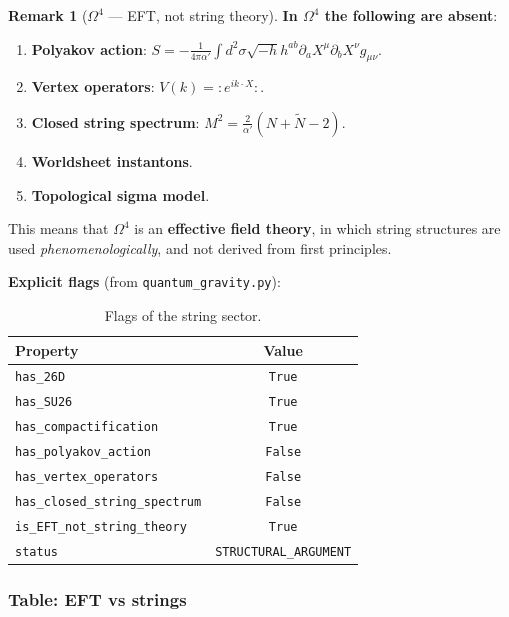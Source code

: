 \documentclass[11pt,a4paper]{article}
\newcommand{\Om}{\ensuremath{\Omega^4}}
\theoremstyle{definition}
\newtheorem{remark}[theorem]{Remark}
\begin{document}
\begin{remark}[$\Om$ --- EFT, not string theory]
\label{rem:string-eft}
\textbf{In $\Om$ the following are absent}:
\begin{enumerate}
    \item \textbf{Polyakov action}:
          $S = -\frac{1}{4\pi\alpha'} \int d^2\sigma \sqrt{-h}
          h^{ab} \partial_a X^\mu \partial_b X^\nu g_{\mu\nu}$.
    \item \textbf{Vertex operators}:
          $V(k) = {:}e^{ik \cdot X}{:}$.
    \item \textbf{Closed string spectrum}:
          $M^2 = \frac{2}{\alpha'}(N + \tilde{N} - 2)$.
    \item \textbf{Worldsheet instantons}.
    \item \textbf{Topological sigma model}.
\end{enumerate}

\medskip\noindent
This means that $\Om$ is an \textbf{effective field theory},
in which string structures are used \emph{phenomenologically},
and not derived from first principles.

\medskip\noindent
\textbf{Explicit flags} (from \texttt{quantum\_gravity.py}):

\begin{table}[ht]
\centering
\caption{Flags of the string sector.}
\label{tab:string-sector-flags}
\begin{tabular}{lc}
\toprule
Property & Value \\
\midrule
\texttt{has\_26D} & \texttt{True} \\
\texttt{has\_SU26} & \texttt{True} \\
\texttt{has\_compactification} & \texttt{True} \\
\midrule
\texttt{has\_polyakov\_action} & \texttt{False} \\
\texttt{has\_vertex\_operators} & \texttt{False} \\
\texttt{has\_closed\_string\_spectrum} & \texttt{False} \\
\midrule
\texttt{is\_EFT\_not\_string\_theory} & \texttt{True} \\
\texttt{status} & \texttt{STRUCTURAL\_ARGUMENT} \\
\bottomrule
\end{tabular}
\end{table}
\end{remark}

\subsubsection{Table: EFT vs strings}
\end{document}
